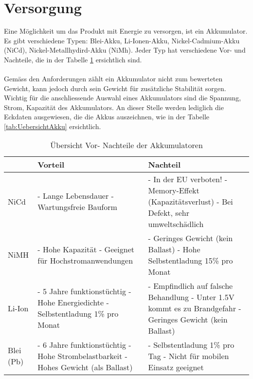 ﻿\section{Versorgung}
Eine Möglichkeit um das Produkt mit Energie zu versorgen, ist ein Akkumulator. Es gibt verschiedene Typen: Blei-Akku, Li-Ionen-Akku, Nickel-Cadmium-Akku (NiCd), Nickel-Metallhydird-Akku (NiMh). Jeder Typ hat verschiedene Vor- und Nachteile, die in der Tabelle \ref{tab:UebersichtVorNachTeil} ersichtlich sind.\\
\\
Gemäss den Anforderungen zählt ein Akkumulator nicht zum bewerteten Gewicht, kann jedoch durch sein Gewicht für zusätzliche Stabilität sorgen. Wichtig für die anschliessende Auswahl eines Akkumulators sind die Spannung, Strom, Kapazität des Akkumulators. An dieser Stelle werden lediglich die Eckdaten ausgewiesen, die die Akkus auszeichnen, wie in der Tabelle \ref{tab:UebersichtAkku} ersichtlich.\\ 


\begin{table}[h!]
	\begin{tabular}{|p{1cm}|p{5cm}|p{6cm}|} \hline
		          &\textbf{Vorteil}  & \textbf{Nachteil}\tabularnewline \hline
		NiCd      &  - Lange Lebensdauer \newline - Wartungsfreie Bauform & - In der EU verboten! \newline -  Memory-Effekt (Kapazitätsverlust) \newline - Bei Defekt, sehr umweltschädlich \tabularnewline \hline
		NiMH      & - Hohe Kapazität \newline - Geeignet für Hochstromanwendungen  & - Geringes Gewicht (kein Ballast) \newline - Hohe Selbstentladung 15\% pro Monat \tabularnewline \hline
		Li-Ion    & - 5 Jahre funktionstüchtig \newline - Hohe Energiedichte \newline - Selbstentladung 1\% pro Monat & - Empfindlich auf falsche Behandlung \newline - Unter 1.5V kommt es zu Brandgefahr \newline - Geringes Gewicht (kein Ballast) \tabularnewline \hline
		Blei (Pb) & - 6 Jahre funktionstüchtig \newline - Hohe Strombelastbarkeit \newline - Hohes Gewicht (als Ballast)  & - Selbstentladung 1\% pro Tag \newline - Nicht für mobilen Einsatz geeignet  \tabularnewline \hline
	\end{tabular}
	\centering
	\caption{Übersicht Vor- Nachteile der Akkumulatoren}
	\label{tab:UebersichtVorNachTeil} 
\end{table}

